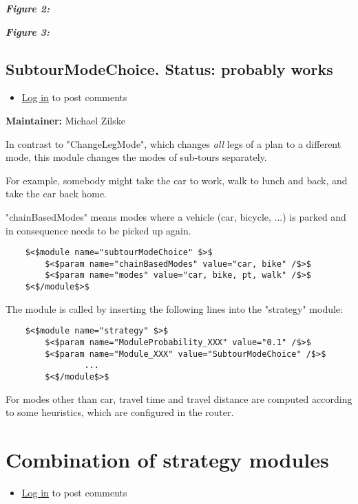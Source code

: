 \documentclass[a4paper,11pt]{report}
\begin{document}
\emph{\textbf{Figure 2:}}





\emph{\textbf{Figure 3:}}








\subsection{SubtourModeChoice. Status: probably works}
\begin{itemize}
	\item \href{http://www.matsim.org/user/login?destination=comment/reply/477%23comment-form}{Log in} to post comments
\end{itemize}

\textbf{Maintainer:} Michael Zilske

In contrast to "ChangeLegMode", which changes \emph{all} legs of a plan to a different mode, this module changes the modes of sub-tours separately.

For example, somebody might take the car to work, walk to lunch and back, and take the car back home.

"chainBasedModes" means modes where a vehicle (car, bicycle,  ...) is parked and in consequence needs to be picked up again.
\begin{verbatim}
	$<$module name="subtourModeChoice" $>$
		$<$param name="chainBasedModes" value="car, bike" /$>$
		$<$param name="modes" value="car, bike, pt, walk" /$>$
	$<$/module$>$

\end{verbatim}

The module is called by inserting the following lines into the "strategy" module:
\begin{verbatim}
	$<$module name="strategy" $>$
		$<$param name="ModuleProbability_XXX" value="0.1" /$>$
		$<$param name="Module_XXX" value="SubtourModeChoice" /$>$
                ...
        $<$/module$>$

\end{verbatim}


For modes other than car, travel time and travel distance are  computed according to some heuristics, which are configured in the  router.

\vfill\eject
\section{Combination of strategy modules}
\begin{itemize}
	\item \href{http://www.matsim.org/user/login?destination=comment/reply/690%23comment-form}{Log in} to post comments
\end{itemize}
\end{document}
